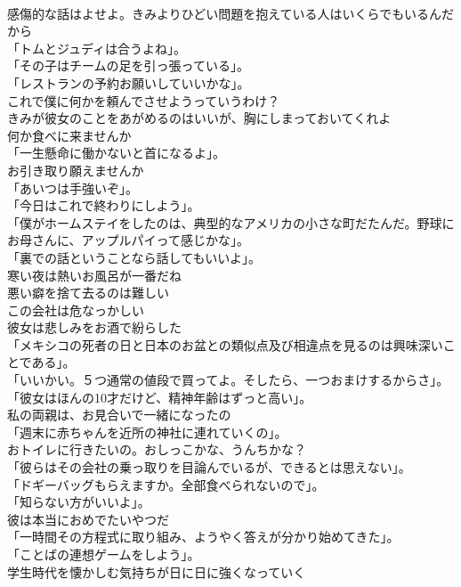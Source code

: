 \documentclass[8pt]{extreport}
\begin{document}
\begin{CJK}{UTF8}{min}
\\	感傷的な話はよせよ。きみよりひどい問題を抱えている人はいくらでもいるんだから	
\\	「トムとジュディは合うよね」。	
\\	「その子はチームの足を引っ張っている」。	
\\	「レストランの予約お願いしていいかな」。	
\\	これで僕に何かを頼んでさせようっていうわけ？	
\\	きみが彼女のことをあがめるのはいいが、胸にしまっておいてくれよ	
\\	何か食べに来ませんか	
\\	「一生懸命に働かないと首になるよ」。	
\\	お引き取り願えませんか	
\\	「あいつは手強いぞ」。	
\\	「今日はこれで終わりにしよう」。	
\\	「僕がホームステイをしたのは、典型的なアメリカの小さな町だたんだ。野球にお母さんに、アップルパイって感じかな」。	
\\	「裏での話ということなら話してもいいよ」。	
\\	寒い夜は熱いお風呂が一番だね	
\\	悪い癖を捨て去るのは難しい	
\\	この会社は危なっかしい	
\\	彼女は悲しみをお酒で紛らした	
\\	「メキシコの死者の日と日本のお盆との類似点及び相違点を見るのは興味深いことである」。	
\\	「いいかい。５つ通常の値段で買ってよ。そしたら、一つおまけするからさ」。	
\\	「彼女はほんの10才だけど、精神年齢はずっと高い」。	
\\	私の両親は、お見合いで一緒になったの	
\\	「週末に赤ちゃんを近所の神社に連れていくの」。	
\\	おトイレに行きたいの。おしっこかな、うんちかな？	
\\	「彼らはその会社の乗っ取りを目論んでいるが、できるとは思えない」。	
\\	「ドギーバッグもらえますか。全部食べられないので」。	
\\	「知らない方がいいよ」。	
\\	彼は本当におめでたいやつだ	
\\	「一時間その方程式に取り組み、ようやく答えが分かり始めてきた」。	
\\	「ことばの連想ゲームをしよう」。	
\\	学生時代を懐かしむ気持ちが日に日に強くなっていく	

\end{CJK}
\end{document}
